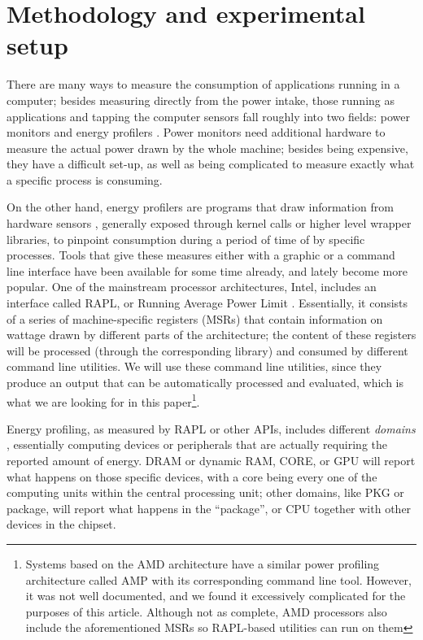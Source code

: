 \documentclass[a4paper,twoside]{article}
\begin{document}
\section{Methodology and experimental setup}
\label{sec:setup}

There are many ways to measure the consumption of applications running in a
computer; besides measuring directly from the power intake, those running as
applications and tapping the computer sensors fall roughly into two fields:
power monitors and energy profilers \cite{cruz21}. Power monitors need
additional hardware to measure the actual power drawn by the whole machine;
besides being expensive, they have a difficult set-up, as well as being
complicated to measure exactly what a specific process is consuming.

On the other hand, energy profilers are programs that draw information from
hardware sensors \cite{sinha2001jouletrack}, generally exposed through kernel
calls or higher level wrapper libraries, to pinpoint consumption during a period
of time of by specific processes. Tools that give these measures either with a
graphic or a command line interface have been available for some time already,
and lately become more popular. One of the mainstream processor architectures,
Intel, includes an interface called RAPL, or Running Average Power Limit
\cite{rapl}. Essentially, it consists of a series of machine-specific registers
(MSRs) that contain information on wattage drawn by different parts of the
architecture; the content of these registers will be processed (through the
corresponding library) and consumed by different command line utilities. We will
use these command line utilities, since they produce an output that can be
automatically processed and evaluated, which is what we are looking for in this
paper\footnote{Systems based on the AMD architecture have a similar power
  profiling architecture called AMP with its corresponding command line
  tool. However, it was not well documented, and we found it excessively
  complicated for the purposes of this article. Although not as complete, AMD
  processors also include the aforementioned MSRs so RAPL-based utilities can
  run on them}.

Energy profiling, as measured by RAPL or other APIs, includes different
\emph{domains} \cite{khan2015energy}, essentially computing devices or
peripherals that are actually requiring the reported amount of energy. DRAM or
dynamic RAM, CORE, or GPU will report what happens on those specific devices,
with a core being every one of the computing units within the central processing
unit; other domains, like PKG or package, will report what happens in the
``package'', or CPU together with other devices in the chipset.
\end{document}
